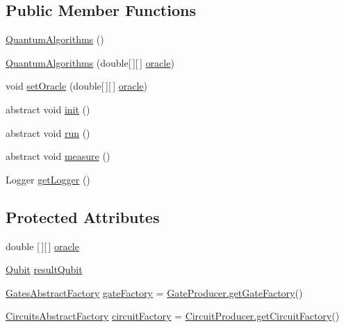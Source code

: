 \subsection*{Public Member Functions}
\begin{DoxyCompactItemize}
\item 
\hyperlink{classcom_1_1ars_1_1algorithms_1_1_quantum_algorithms_a55a8e679534f3f4e5629504d4eae8fc9}{Quantum\+Algorithms} ()
\item 
\hyperlink{classcom_1_1ars_1_1algorithms_1_1_quantum_algorithms_a1ec69e5ec9aa5a35743950c4d4e50f62}{Quantum\+Algorithms} (double\mbox{[}$\,$\mbox{]}\mbox{[}$\,$\mbox{]} \hyperlink{classcom_1_1ars_1_1algorithms_1_1_quantum_algorithms_a1dee0d926787964b9c8d3daa6355dc70}{oracle})
\item 
void \hyperlink{classcom_1_1ars_1_1algorithms_1_1_quantum_algorithms_a71cfe9109e3a0ff9c2b7e5d4cc16c4d8}{set\+Oracle} (double\mbox{[}$\,$\mbox{]}\mbox{[}$\,$\mbox{]} \hyperlink{classcom_1_1ars_1_1algorithms_1_1_quantum_algorithms_a1dee0d926787964b9c8d3daa6355dc70}{oracle})
\item 
abstract void \hyperlink{classcom_1_1ars_1_1algorithms_1_1_quantum_algorithms_ae2f995342974067844f8cf671e156269}{init} ()
\item 
abstract void \hyperlink{classcom_1_1ars_1_1algorithms_1_1_quantum_algorithms_ae36bd570c176a3f11b6a3ef666d49a9d}{run} ()
\item 
abstract void \hyperlink{classcom_1_1ars_1_1algorithms_1_1_quantum_algorithms_afcae7e993d2d70942a7ffd6485c44b1e}{measure} ()
\item 
Logger \hyperlink{classcom_1_1ars_1_1algorithms_1_1_quantum_algorithms_a15adb03c61ab3d3fe4f6abfeac1eeaef}{get\+Logger} ()
\end{DoxyCompactItemize}
\subsection*{Protected Attributes}
\begin{DoxyCompactItemize}
\item 
double \mbox{[}$\,$\mbox{]}\mbox{[}$\,$\mbox{]} \hyperlink{classcom_1_1ars_1_1algorithms_1_1_quantum_algorithms_a1dee0d926787964b9c8d3daa6355dc70}{oracle}
\item 
\hyperlink{classcom_1_1ars_1_1qubits_1_1_qubit}{Qubit} \hyperlink{classcom_1_1ars_1_1algorithms_1_1_quantum_algorithms_ad04f21f877bc7d662c857a31ff07b65b}{result\+Qubit}
\item 
\hyperlink{classcom_1_1ars_1_1gates_1_1_gates_abstract_factory}{Gates\+Abstract\+Factory} \hyperlink{classcom_1_1ars_1_1algorithms_1_1_quantum_algorithms_a4a69f924d80667c1a262ef0c150c0a02}{gate\+Factory} = \hyperlink{classcom_1_1ars_1_1gates_1_1_gate_producer_a643829e30db1500430781afb9bc825e9}{Gate\+Producer.\+get\+Gate\+Factory}()
\item 
\hyperlink{classcom_1_1ars_1_1circuits_1_1_circuits_abstract_factory}{Circuits\+Abstract\+Factory} \hyperlink{classcom_1_1ars_1_1algorithms_1_1_quantum_algorithms_a862f92cacd8b83602459530e99791455}{circuit\+Factory} = \hyperlink{classcom_1_1ars_1_1circuits_1_1_circuit_producer_a309e58fbb248b354abc746f9a82233eb}{Circuit\+Producer.\+get\+Circuit\+Factory}()
\end{DoxyCompactItemize}


